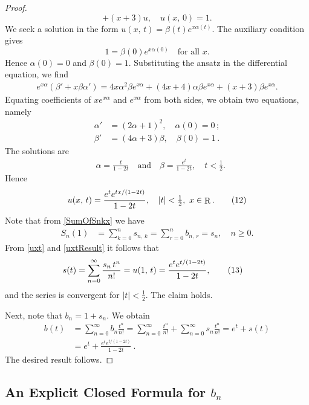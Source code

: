 \documentclass[11pt]{article}
\newcommand{\q}{\quad}
\newcommand{\ges}{\geqslant}
\DeclareMathOperator{\R}{R}
\begin{document}
\begin{proof}
\[+(x+3)u,\q u(x,\,0)=1.
\]
We seek a solution in the form $u(x,\,t)=\beta(t) e^{x\alpha(t)}$.
The auxiliary condition gives 
$$1=\beta(0)e^{x\alpha(0)} \q\text{for all } x.
$$ 
Hence $\alpha(0)=0$ and $\beta(0)=1$.
Substituting the ansatz in the differential equation, we find
\begin{align*}
e^{x\alpha}(\beta'+x\beta\alpha')=4x\alpha^2\beta e^{x\alpha} +(4x+4)\alpha\beta e^{x\alpha} 
+(x+3)\beta e^{x\alpha}.
\end{align*}
Equating coefficients of $xe^{x\alpha}$ and $e^{x\alpha}$ from both sides, we obtain two equations, namely
 \begin{align*}
 \alpha'&=(2\alpha+1)^2,\q \alpha(0)=0\,;\\[4pt]
 \beta'&=(4\alpha+3)\beta,\q\beta(0)=1\,.
 \end{align*}
The solutions are
\begin{align*}
&\alpha=\frac{t}{1-2t}\q\text{and}\q\beta=\frac{e^t}{1-2t},\q t<\tfrac12.
\end{align*}
Hence
\[{\label{uxtResult}}
u(x,\,t)=\frac{e^te^{tx/(1-2t)}}{1-2t},\q |t|<\tfrac12,~ x\in\R. \tag{12}
\]
Note that from \eqref{SumOfSnkx} we have
\begin{align*}
S_n(1)&=\sum_{k=0}^n s_{n,\,k}=\sum_{r=0}^nb_{n,\,r}=s_n,\q n\ges 0.
\end{align*}
From \eqref{uxt} and \eqref{uxtResult} it follows that
\begin{align*}{\label{stResult}}
s(t)&=\sum_{n=0}^\infty\frac{ s_n\,t^n}{n!}=u(1,\,t)=\frac{e^te^{t/(1-2t)}}{1-2t},\tag{13}
\end{align*}
and the series is convergent for $|t|<\frac12$. The claim holds.

Next, note that
$
b_n=1+s_n.
$
We obtain
\begin{align*}
  b(t)&=\sum_{n=0}^{\infty}b_n\frac{t^n}{n!}=\sum_{n=0}^{\infty}\frac{t^n}{n!}+\sum_{n=0}^{\infty}s_n\frac{t^n}{n!}=e^t+s(t)\\
    &=e^t + \frac{e^te^{t/(1-2t)}}{1-2t}~.
\end{align*}
The desired result follows.
\end{proof}



\subsection{An Explicit Closed Formula for $b_n$}
\end{document}
